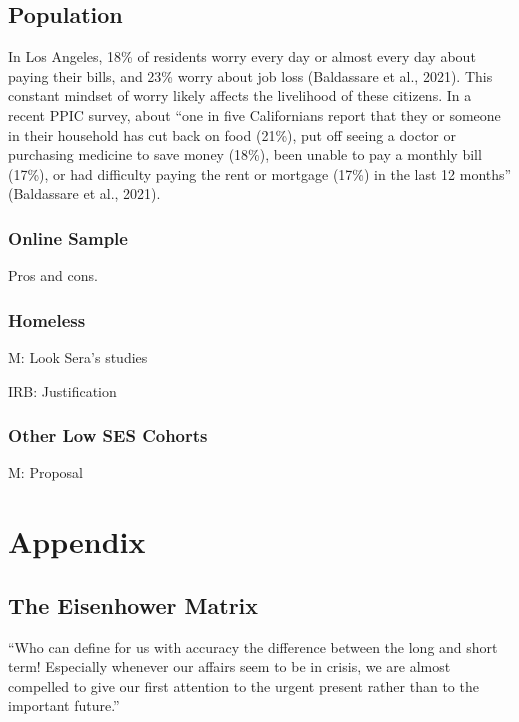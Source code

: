 \hypertarget{population}{%
\subsection{Population}\label{population}}

In Los Angeles, 18\% of residents worry every day or almost every day
about paying their bills, and 23\% worry about job loss (Baldassare et
al., 2021). This constant mindset of worry likely affects the livelihood
of these citizens. In a recent PPIC survey, about ``one in five
Californians report that they or someone in their household has cut back
on food (21\%), put off seeing a doctor or purchasing medicine to save
money (18\%), been unable to pay a monthly bill (17\%), or had
difficulty paying the rent or mortgage (17\%) in the last 12 months''
(Baldassare et al., 2021).

\hypertarget{online-sample}{%
\subsubsection{Online Sample}\label{online-sample}}

Pros and cons.

\hypertarget{homeless}{%
\subsubsection{Homeless}\label{homeless}}

M: Look Sera's studies

IRB: Justification

\hypertarget{other-low-ses-cohorts}{%
\subsubsection{Other Low SES Cohorts}\label{other-low-ses-cohorts}}

M: Proposal

\hypertarget{appendix}{%
\section*{Appendix}\label{appendix}}

\hypertarget{app-eisenhower}{%
\subsection{The Eisenhower Matrix}\label{app-eisenhower}}

``Who can define for us with accuracy the difference between the long
and short term! Especially whenever our affairs seem to be in crisis, we
are almost compelled to give our first attention to the urgent present
rather than to the important future.''

